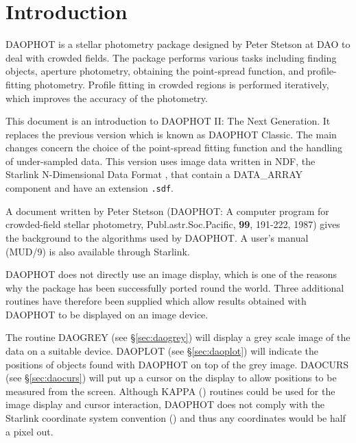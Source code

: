 \stardocabstract
 \newpage
 \begin{latexonly}
   \setlength{\parskip}{0mm}
   \latexonlytoc
   \setlength{\parskip}{\medskipamount}
   \markright{\stardocname}
 \end{latexonly}
\newpage
\renewcommand{\thepage}{\arabic{page}}
\setcounter{page}{1}

\section{Introduction}
\label{sec:intro}

DAOPHOT is a stellar photometry package designed by Peter Stetson at DAO to deal 
with crowded fields. The package performs various tasks including
finding objects, aperture photometry, obtaining the point-spread function, and
profile-fitting photometry. Profile fitting in crowded regions is performed
iteratively, which improves the accuracy of the photometry. 

This document is an introduction to DAOPHOT II: The Next Generation. It replaces
the previous version which is known as DAOPHOT Classic. The main changes concern
the choice of the point-spread fitting function and the handling of under-sampled
data. This version uses image data written in NDF, the Starlink N-Dimensional
Data Format , that contain a DATA\_ARRAY component
and have an extension {\tt .sdf}. 

A document written by Peter Stetson (DAOPHOT: A computer program for crowded-field
stellar photometry, Publ.astr.Soc.Pacific, {\bf 99}, 191-222, 1987)
gives the background to the algorithms used by DAOPHOT. A user's manual (MUD/9)
is also available through Starlink.

DAOPHOT does not directly use an image display, which is one of the reasons why the
package has been successfully ported round the world. Three additional routines
have therefore been supplied which allow results obtained with DAOPHOT to be
displayed on an image device. 

The routine DAOGREY (see \S{\ref{sec:daogrey}})
will display a grey scale image of the data on a suitable
device. DAOPLOT (see \S{\ref{sec:daoplot}})
will indicate the positions of objects found with DAOPHOT on top of
the grey image. DAOCURS (see \S{\ref{sec:daocurs}})
will put up a cursor on the display to allow positions to
be measured from the screen. Although KAPPA () routines could
be used for the image display and cursor interaction, DAOPHOT does not comply with
the Starlink coordinate system convention () and thus any
coordinates would be half a pixel out. 

